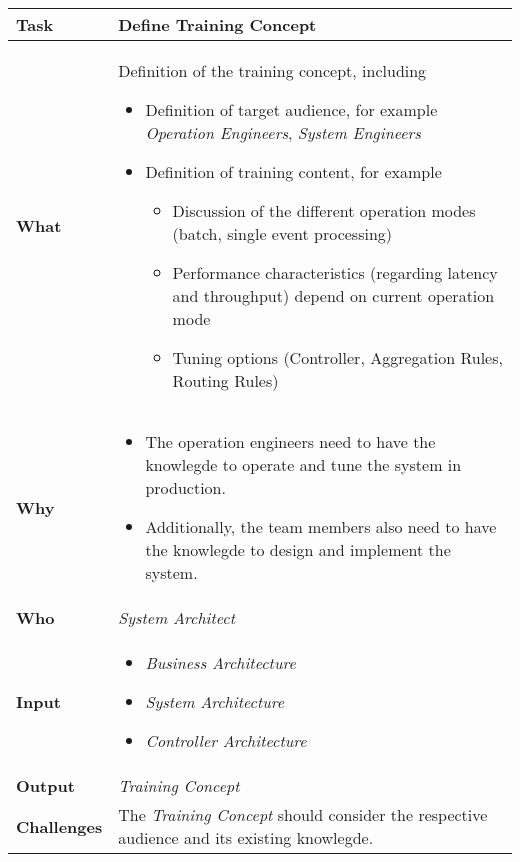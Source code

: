\begin{tabularx}{\textwidth}{@{} l X @{}}
	\caption{Define Training Concept} \label{table:ch6_Task_Define_Training_Concept}\\
	\toprule 
	\bfseries Task & Define Training Concept\\
	\midrule 
	\bfseries What & Definition of the training concept, including
	\begin{itemize}
		\item Definition of target audience, for example \emph{Operation Engineers}, \emph{System Engineers}
		\item Definition of training content, for example
		\begin{itemize}
			\item Discussion of the different operation modes (batch, single event processing)
			\item Performance characteristics (regarding latency and throughput) depend on current operation mode
			\item Tuning options (Controller, Aggregation Rules, Routing Rules)
		\end{itemize}
	\end{itemize}
	\\
	\midrule 
	\bfseries Why & 
	\begin{itemize}
		\item The operation engineers need to have the knowlegde to operate and tune the system in production.
		\item Additionally, the team members also need to have the knowlegde to design and implement the system.
	\end{itemize}
	\\
	\midrule 
	\bfseries Who & \emph{System Architect}\\
	\midrule 
	\bfseries Input & 
	\begin{itemize}
		\item \emph{Business Architecture}
		\item \emph{System Architecture}
		\item \emph{Controller Architecture}
	\end{itemize}\\
	\midrule
	\bfseries Output & \emph{Training Concept}\\
	\midrule 
	\bfseries Challenges & The \emph{Training Concept} should consider the respective audience and its existing knowlegde.\\
	\bottomrule 
\end{tabularx}


